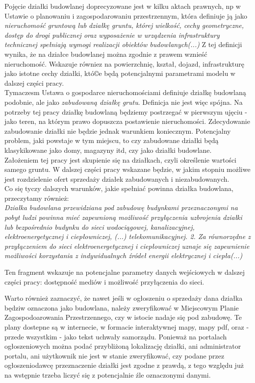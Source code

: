 \documentclass[a4paper,12pt,twoside,openany]{report}
\begin{document}
Pojęcie działki budowlanej doprecyzowane jest w kilku aktach prawnych, np w Ustawie o planowaniu i zagospodarowaniu przestrzennym, która definiuje ją jako \textit {nieruchomość gruntową lub działkę gruntu, której wielkość, cechy geometryczne, dostęp do drogi publicznej oraz wyposażenie w urządzenia infrastruktury technicznej spełniają wymogi realizacji obiektów budowlanych(...)}
\cite{Uopizp}
Z tej definicji wynika, że na działce budowlanej można zgodnie z prawem wznieść nieruchomość. Wskazuje równiez na powierzchnię, kształ, dojazd, infrastrukturę jako istotne cechy działki, któ©e będą potencjalnymi parametrami modelu w dalszej części pracy.\\

Tymaczesm Ustawa o gospodarce nieruchomościami  definiuje działkę budowlaną podobnie, ale jako \textit {zabudowaną działkę grutu}\cite{Uogn}. Definicja nie jest więc spójna. 
Na potrzeby tej pracy działkę budowlaną będziemy postrzegać w pierwszym ujęciu -jako teren, na którym prawo dopuszcza postawienie nieruchomości. Zdecydowanie zabudowanie działki nie będzie jednak warunkiem koniecznym.
Potencjalny problem, jaki powstaje w tym miejscu, to czy zabudowane działki
będą klasykikowane jako domy, magazyny itd, czy jako działki budowlane.\\


Założeniem tej pracy jest skupienie się na działkach, czyli określenie wartości samego gruntu. W dalszej części pracy wskazane będzie, w jakim stopniu możliwe jest rozdzielenie ofert sprzedaży działek zabudowanych i niezabudowanych.\\


Co się tyczy dalszych warunków, jakie spełniać powinna działka budowlana, przeczytamy również: \\


 \textit {Działka budowlana przewidziana pod zabudowę budynkami przeznaczonymi na pobyt ludzi powinna mieć zapewnioną możliwość przyłączenia uzbrojenia działki lub bezpośrednio budynku do sieci wodociągowej, kanalizacyjnej, elektroenergetycznej i ciepłowniczej, (...) telekomunikacyjnej. 2. Za równorzędne z przyłączeniem do sieci elektroenergetycznej i ciepłowniczej uznaje się zapewnienie możliwości korzystania  z indywidualnych  źródeł  energii  elektrycznej  i ciepła(...)}\cite{RMI}

Ten fragment wskazuje na potencjalne parametry danych wejściowych w dalszej części pracy: dostępność mediów i możliwość przyłączenia do sieci.


Warto również zaznaczyć, że nawet jeśli w ogłoszeniu o sprzedaży dana działka będziw oznaczona jako budowlana, należy zweryfikować w  Miejscowym Planie Zagospodoarowania Przestrzennego, czy w istocie nadaje się pod zabudowę. Te plany dostepne są w internecie, w formacie interaktywnej mapy, mapy pdf, oraz - przede wszystkim - jako tekst uchwały samorządu. 
Ponieważ na portalach ogłoszeniowych można podać przybliżoną lokalizację działki, ani administrator portalu, ani użytkownik nie jest w stanie zweryfikować, czy podane przez ogłoszeniodawcę przeznaczenie działki jest zgodne z prawdą, z tego względu już na wstępnie trzeba liczyć się z potencjalnie źle oznaczonymi danymi.
\end{document}
